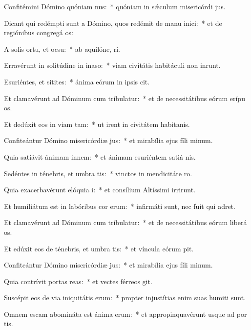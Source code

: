 \item Confitémini Dómino quóniam nus:~* quóniam in sǽculum misericórdi jus.
\item Dicant qui redémpti sunt a Dómino, quos redémit de manu inici:~* et de regiónibus congregá os:
\item A solis ortu, et ocsu:~* ab aquilóne,  ri.
\item Erravérunt in solitúdine in inaso:~* viam civitátis habitáculi non inrunt.
\item Esuriéntes, et sitites:~* ánima eórum in ipsis cit.
\item Et clamavérunt ad Dóminum cum tribulatur:~* et de necessitátibus eórum erípu os.
\item Et dedúxit eos in viam tam:~* ut irent in civitátem habitanis.
\item Confiteántur Dómino misericórdiæ jus:~* et mirabília ejus fíli minum.
\item Quia satiávit ánimam innem:~* et ánimam esuriéntem satiá nis.
\item Sedéntes in ténebris, et umbra tis:~* vinctos in mendicitáte  ro.
\item Quia exacerbavérunt elóquia i:~* et consílium Altíssimi irrirunt.
\item Et humiliátum est in labóribus cor erum:~* infirmáti sunt, nec fuit qui adret.
\item Et clamavérunt ad Dóminum cum tribulatur:~* et de necessitátibus eórum liberá os.
\item Et edúxit eos de ténebris, et umbra tis:~* et víncula eórum pit.
\item Confiteántur Dómino misericórdiæ jus:~* et mirabília ejus fíli minum.
\item Quia contrívit portas reas:~* et vectes férreos git.
\item Suscépit eos de via iniquitátis erum:~* propter injustítias enim suas humiti sunt.
\item Omnem escam abomináta est ánima erum:~* et appropinquavérunt usque ad por tis.
